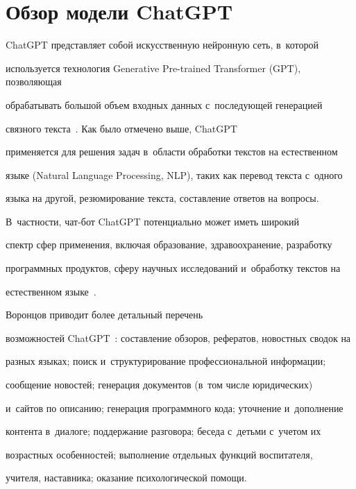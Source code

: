 \section{Обзор модели ChatGPT}


   


   ChatGPT представляет собой искусственную нейронную сеть, в~которой 


используется технология Generative Pre-trained Transformer (GPT), поз\-во\-ля\-ющая 


обрабатывать большой объем входных данных с~по\-сле\-ду\-ющей генерацией 


связного текс\-та~\cite{14-eg}. Как было отмечено выше, \mbox{ChatGPT} 


применяется для решения задач в~об\-ласти обработки текс\-тов на естественном 


языке (Natural Language Processing, NLP), таких как перевод текс\-та с~одного 


языка на другой, резюмирование текс\-та, со\-став\-ле\-ние ответов на вопросы. 


В~част\-ности, чат-бот \mbox{ChatGPT} потенциально может иметь широкий 


спектр сфер применения, включая образование, здравоохранение, разработку 


про\-грам\-мных продуктов, сферу научных исследований и~обработку текс\-тов на 


естественном языке~\cite{15-eg}.


   


Воронцов приводит более детальный перечень 


возможностей \mbox{ChatGPT}~\cite{16-eg}: со\-став\-ле\-ние обзоров, рефератов, новостных сводок на 


раз\-ных языках; поиск и~структурирование профессиональной информации; 


сообщение новостей; генерация документов (в~том чис\-ле юридических) 


и~сайтов по описанию; генерация программного кода; уточ\-не\-ние и~до\-пол\-не\-ние 


кон\-тен\-та в~диалоге; под\-дер\-жа\-ние разговора; беседа с~детьми с~учетом их 


воз\-раст\-ных особенностей; выполнение отдельных функций воспитателя, 


учителя, на\-став\-ни\-ка; оказание психологической по\-мощи. 


